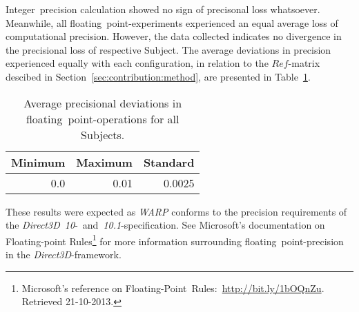 \documentclass[fleqn,10pt]{SelfArx} %
\begin{document}
\noindent
Integer~precision calculation showed no sign of precisonal loss whatsoever. Meanwhile, all floating~point-experiments experienced an equal average loss of computational precision. However, the data collected indicates no divergence in the precisional loss of respective Subject. The average deviations in precision experienced equally with each configuration, in relation to the $Ref$-matrix descibed in Section~\ref{sec:contribution:method}, are presented in Table~\ref{tab:contribution:results:avgprecision}.
\label{sec:contribution:results:computationalprecision}
\begin{table}[hbt]
\begin{center}
	\begin{tabular}{|r|r|r|}
		\hline
		\textbf{Minimum} 	& \textbf{Maximum} 	& \textbf{Standard} 	\\ \hline
		0.0     			& ~0.01   			& ~0.0025            		\\ \hline
	\end{tabular}
\caption {Average precisional deviations in floating~point-operations for all Subjects.}
\label{tab:contribution:results:avgprecision}
\end{center}
\end{table}

\noindent
These results were expected as \textit{WARP} conforms to the precision requirements of the \textit{Direct3D~10}-~and~\textit{10.1}-specification. See Microsoft's documentation on Floating-point Rules\footnote{Microsoft's reference on Floating-Point~Rules:~\url{http://bit.ly/1bOQnZu}. Retrieved 21-10-2013.} for more information surrounding floating~point-precision in the \textit{Direct3D}-framework.


\end{document}
